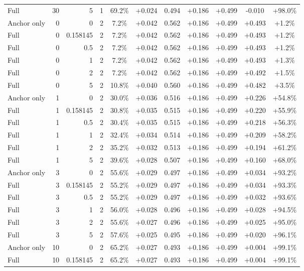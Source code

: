 \begin{table}[htbp]
\begin{tabular}{lrrrccccccc}
Full & 30 & 5 & 1 & 69.2\% & +0.024 & 0.494 & +0.186 & +0.499 & -0.010 & +98.0\% \\
Anchor only & 0 & 0 & 2 & 7.2\% & +0.042 & 0.562 & +0.186 & +0.499 & +0.493 & +1.2\% \\
Full & 0 & 0.158145 & 2 & 7.2\% & +0.042 & 0.562 & +0.186 & +0.499 & +0.493 & +1.2\% \\
Full & 0 & 0.5 & 2 & 7.2\% & +0.042 & 0.562 & +0.186 & +0.499 & +0.493 & +1.2\% \\
Full & 0 & 1 & 2 & 7.2\% & +0.042 & 0.562 & +0.186 & +0.499 & +0.493 & +1.3\% \\
Full & 0 & 2 & 2 & 7.2\% & +0.042 & 0.562 & +0.186 & +0.499 & +0.492 & +1.5\% \\
Full & 0 & 5 & 2 & 10.8\% & +0.040 & 0.560 & +0.186 & +0.499 & +0.482 & +3.5\% \\
Anchor only & 1 & 0 & 2 & 30.0\% & +0.036 & 0.516 & +0.186 & +0.499 & +0.226 & +54.8\% \\
Full & 1 & 0.158145 & 2 & 30.8\% & +0.035 & 0.515 & +0.186 & +0.499 & +0.220 & +55.9\% \\
Full & 1 & 0.5 & 2 & 30.4\% & +0.035 & 0.515 & +0.186 & +0.499 & +0.218 & +56.3\% \\
Full & 1 & 1 & 2 & 32.4\% & +0.034 & 0.514 & +0.186 & +0.499 & +0.209 & +58.2\% \\
Full & 1 & 2 & 2 & 35.2\% & +0.032 & 0.513 & +0.186 & +0.499 & +0.194 & +61.2\% \\
Full & 1 & 5 & 2 & 39.6\% & +0.028 & 0.507 & +0.186 & +0.499 & +0.160 & +68.0\% \\
Anchor only & 3 & 0 & 2 & 55.6\% & +0.029 & 0.497 & +0.186 & +0.499 & +0.034 & +93.2\% \\
Full & 3 & 0.158145 & 2 & 55.2\% & +0.029 & 0.497 & +0.186 & +0.499 & +0.034 & +93.3\% \\
Full & 3 & 0.5 & 2 & 55.2\% & +0.029 & 0.497 & +0.186 & +0.499 & +0.032 & +93.6\% \\
Full & 3 & 1 & 2 & 56.0\% & +0.028 & 0.496 & +0.186 & +0.499 & +0.028 & +94.5\% \\
Full & 3 & 2 & 2 & 55.6\% & +0.027 & 0.496 & +0.186 & +0.499 & +0.025 & +95.0\% \\
Full & 3 & 5 & 2 & 57.6\% & +0.025 & 0.495 & +0.186 & +0.499 & +0.020 & +96.1\% \\
Anchor only & 10 & 0 & 2 & 65.2\% & +0.027 & 0.493 & +0.186 & +0.499 & +0.004 & +99.1\% \\
Full & 10 & 0.158145 & 2 & 65.2\% & +0.027 & 0.493 & +0.186 & +0.499 & +0.004 & +99.1\% \\

\end{tabular}
\end{table}
